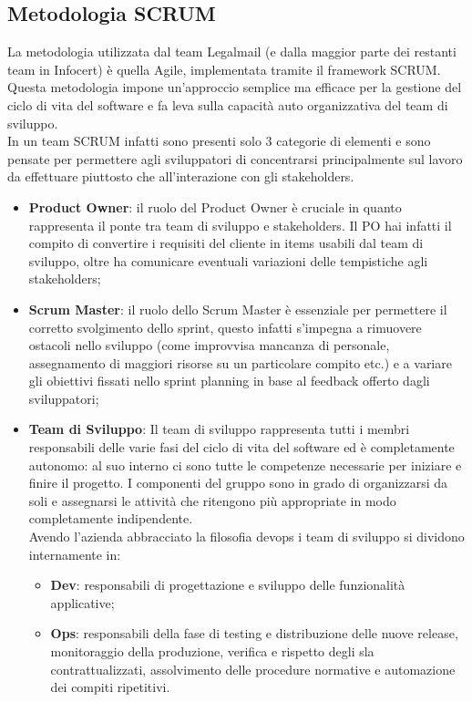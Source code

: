 \subsection{Metodologia SCRUM}
La metodologia utilizzata dal team Legalmail (e dalla maggior parte dei restanti team in Infocert) è quella Agile, implementata tramite il \gls{framework} SCRUM.
Questa metodologia impone un'approccio semplice ma efficace per la gestione del ciclo di vita del software e fa leva sulla capacità auto organizzativa del team di sviluppo. \\
In un team SCRUM infatti sono presenti solo 3 categorie di elementi e sono pensate per permettere agli sviluppatori di concentrarsi principalmente sul lavoro da effettuare piuttosto che all'interazione con gli \gls{stakeholders}.
\begin{itemize}
	\item \textbf{Product Owner}: il ruolo del Product Owner è cruciale in quanto rappresenta il ponte tra team di sviluppo e stakeholders. Il PO hai infatti il compito di convertire i requisiti del cliente in items usabili dal team di sviluppo, oltre ha comunicare eventuali variazioni delle tempistiche agli stakeholders;
	\item \textbf{Scrum Master}: il ruolo dello Scrum Master è essenziale per permettere il corretto svolgimento dello sprint, questo infatti s'impegna a rimuovere ostacoli nello sviluppo (come improvvisa mancanza di personale, assegnamento di maggiori risorse su un particolare compito etc.) e a variare gli obiettivi fissati nello sprint planning in base al feedback offerto dagli sviluppatori;
	\item \textbf{Team di Sviluppo}: Il team di sviluppo rappresenta tutti i membri responsabili delle varie fasi del ciclo di vita del software ed è completamente autonomo: al suo interno ci sono tutte le competenze necessarie per iniziare e finire il progetto. I componenti del gruppo sono in grado di organizzarsi da soli e assegnarsi le attività che ritengono più appropriate in modo completamente indipendente. \\
	Avendo l'azienda abbracciato la filosofia \gls{devops} i team di sviluppo si dividono internamente in:
	\begin{itemize}
		\item \textbf{Dev}: responsabili di progettazione e sviluppo delle funzionalità applicative;
		\item \textbf{Ops}: responsabili della fase di testing e distribuzione delle nuove \gls{release}, monitoraggio della produzione, verifica e rispetto degli \gls{sla} contrattualizzati, assolvimento delle procedure normative e automazione dei compiti ripetitivi.
	\end{itemize}
\end{itemize}

